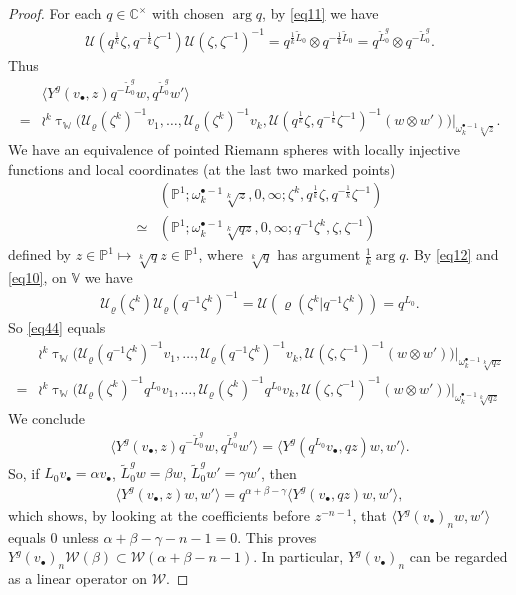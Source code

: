 \documentclass[12pt,a4paper,notitlepage]{article}
\theoremstyle{definition}
\theoremstyle{plain}
\newcommand{\mc}{\mathcal}
\newcommand{\wtd}{\widetilde}
\newcommand{\bk}[1]{\langle {#1}\rangle}
\newcommand{\blt}{\bullet}
\newcommand{\Vbb}{\mathbb V}
\newcommand{\Wbb}{\mathbb W}
\newcommand{\Cbb}{\mathbb C}
\newcommand{\Pbb}{\mathbb P}
\numberwithin{equation}{section}
\begin{document}
\begin{proof}
For each $q\in\Cbb^\times$ with chosen $\arg q$, by \eqref{eq11} we have
\begin{align*}
\mc U(q^{\frac 1k}\zeta,q^{-\frac 1k}\zeta^{-1})\mc U(\zeta,\zeta^{-1})^{-1}=q^{\frac 1k\wtd L_0}\otimes q^{-\frac 1k\wtd L_0}=q^{\wtd L_0^g}\otimes q^{-\wtd L_0^g}.	
\end{align*}
Thus
\begin{align}
&\bk{Y^g(v_\blt,z)q^{-\wtd L_0^g}w,q^{\wtd L_0^g}w'}\nonumber\\
=&\wr^k\uptau_\Wbb\big(\mc U_\varrho(\zeta^k)^{-1}v_1,\dots,\mc U_\varrho(\zeta^k)^{-1}v_k,\mc U(q^{\frac 1k}\zeta,q^{-\frac 1k}\zeta^{-1})^{-1}(w\otimes w')\big)\Big|_{\omega_k^{\blt-1}\sqrt[k]z}.	\label{eq44}
\end{align}
We have an equivalence of pointed Riemann spheres with locally injective functions and local coordinates (at the last two marked points)
\begin{align*}
&(\Pbb^1;\omega_k^{\blt-1}\sqrt[k]z,0,\infty;\zeta^k,q^{\frac 1k}\zeta,q^{-\frac 1k}\zeta^{-1})\\
\simeq&	(\Pbb^1;\omega_k^{\blt-1}\sqrt[k]{qz},0,\infty;q^{-1}\zeta^k,\zeta,\zeta^{-1})
\end{align*}
defined by $z\in\Pbb^1\mapsto \sqrt[k]{q}z\in\Pbb^1$, where $\sqrt[k]{q}$ has argument $\frac 1k\arg q$. By \eqref{eq12} and \eqref{eq10}, on $\Vbb$ we have
\begin{align*}
	\mc U_\varrho(\zeta^k)\mc U_\varrho(q^{-1}\zeta^k)^{-1}=\mc U(\varrho(\zeta^k|q^{-1}\zeta^k))=q^{L_0}.	
\end{align*}
So \eqref{eq44} equals
\begin{align*}
&\wr^k\uptau_\Wbb\big(\mc U_\varrho(q^{-1}\zeta^k)^{-1}v_1,\dots,\mc U_\varrho(q^{-1}\zeta^k)^{-1}v_k,\mc U(\zeta,\zeta^{-1})^{-1}(w\otimes w')\big)\Big|_{\omega_k^{\blt-1}\sqrt[k]{qz}}\\
=&\wr^k\uptau_\Wbb\big(\mc U_\varrho(\zeta^k)^{-1}q^{L_0}v_1,\dots,\mc U_\varrho(\zeta^k)^{-1}q^{L_0}v_k,\mc U(\zeta,\zeta^{-1})^{-1}(w\otimes w')\big)\Big|_{\omega_k^{\blt-1}\sqrt[k]{qz}}
\end{align*}
We conclude
\begin{align*}
\bk{Y^g(v_\blt,z)q^{-\wtd L_0^g}w,q^{\wtd L_0^g}w'}=\bk{Y^g(q^{L_0}v_\blt,qz)w,w'}.	
\end{align*}
So, if $L_0 v_\blt=\alpha v_\blt$, $\wtd L_0^gw=\beta w$, $\wtd L_0^g w'=\gamma w'$, then
\begin{align*}
\bk{Y^g(v_\blt,z)w,w'}=q^{\alpha+\beta-\gamma}\bk{Y^g(v_\blt,qz)w,w'},	
\end{align*}
which shows, by looking at the coefficients before  $z^{-n-1}$, that $\bk {Y^g(v_\blt)_nw,w'}$ equals $0$ unless $\alpha+\beta-\gamma-n-1=0$. This proves $Y^g(v_\blt)_n\mc W(\beta)\subset \mc W(\alpha+\beta-n-1)$. In particular, $Y^g(v_\blt)_n$ can be regarded as a linear operator on $\mc W$.
\end{proof}
\end{document}
